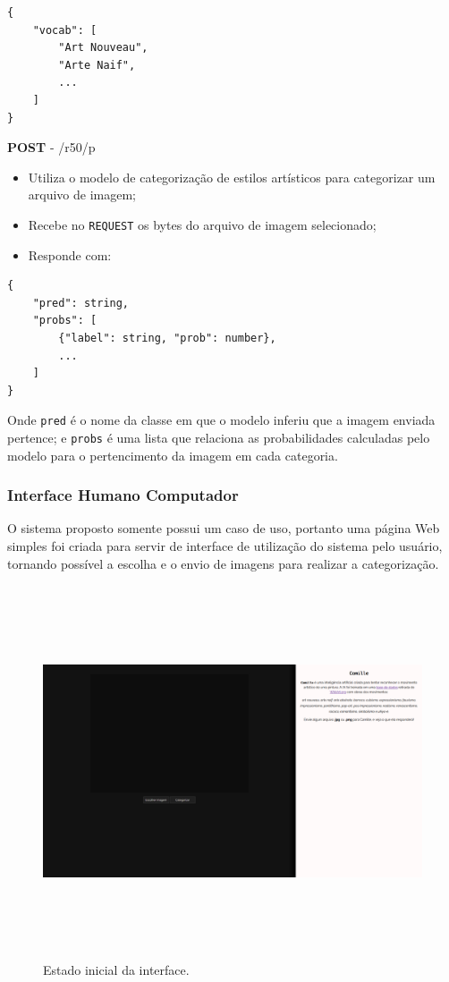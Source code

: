 \documentclass[12pt, a4paper]{article}
\begin{document}
\begin{lstlisting}
{
	"vocab": [
		"Art Nouveau", 
		"Arte Naif", 
		...
	]
}
\end{lstlisting}

\bigskip
\noindent
\textbf{POST} - /r50/p

\begin{itemize}
\item Utiliza o modelo de categorização de estilos artísticos para categorizar um arquivo de imagem;
\item Recebe no \lstinline{REQUEST} os bytes do arquivo de imagem selecionado;
\item Responde com:
\end{itemize}

\begin{lstlisting}
{
	"pred": string, 
	"probs": [
		{"label": string, "prob": number}, 
		...
	]
}
\end{lstlisting}

Onde \lstinline{pred} é o nome da classe em que o modelo inferiu que a imagem enviada pertence; e \lstinline{probs} é uma lista que relaciona as probabilidades calculadas pelo modelo para o pertencimento da imagem em cada categoria.

\subsubsection{Interface Humano Computador}
O sistema proposto somente possui um caso de uso, portanto uma página Web simples foi criada para servir de interface de utilização do sistema pelo usuário, tornando possível a escolha e o envio de imagens para realizar a categorização.

\begin{figure}[H]
	\centering
	\includegraphics[width=\textwidth, height=11cm, keepaspectratio=true]{fig/site_noimg}
	\caption{Estado inicial da interface.}
\end{figure}
\end{document}

